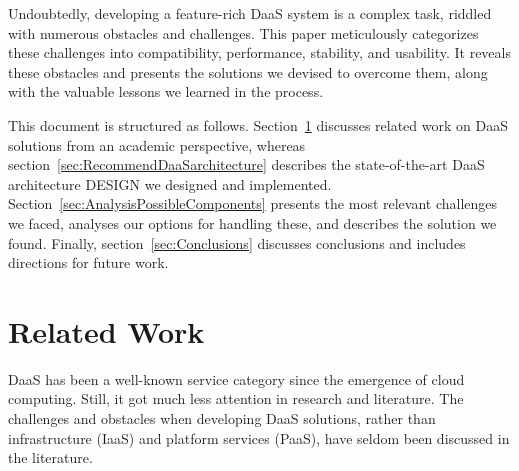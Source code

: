 \documentclass[runningheads]{llncs}
\begin{document}
Undoubtedly, developing a feature-rich DaaS system is a complex task, riddled with numerous obstacles and challenges. This paper meticulously categorizes these challenges into compatibility, performance, stability, and usability. It reveals these obstacles and presents the solutions we devised to overcome them, along with the valuable lessons we learned in the process.

This document is structured as follows. Section~\ref{sec:relatedworkAbschnitt} discusses related work on DaaS solutions from an academic perspective, whereas section~\ref{sec:RecommendDaaSarchitecture} describes the state-of-the-art DaaS architecture DESIGN we designed and implemented. Section~\ref{sec:AnalysisPossibleComponents} presents the most relevant challenges we faced, analyses our options for handling these, and describes the solution we found. Finally, section~\ref{sec:Conclusions} discusses conclusions and includes directions for future work.



\section{Related Work}
\label{sec:relatedworkAbschnitt}


DaaS has been a well-known service category since the emergence of cloud computing. Still, it got much less attention in research and literature.
The challenges and obstacles when developing DaaS solutions, rather than infrastructure (IaaS) and platform services (PaaS), have seldom been discussed in the literature.
\end{document}
